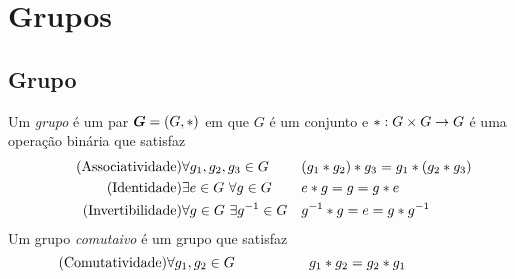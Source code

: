 \chapter{Grupos}

\section{Grupo}


\begin{defi}
	Um \emph{grupo} é um par $\bm G=(G, \ast )$ em que $G$ é um conjunto e $ \ast : G \times G \to G$ é uma operação binária que satisfaz
	\begin{align*}
 	\tag{Associatividade} &\forall g_1,g_2,g_3 \in G && (g_1  \ast  g_2)  \ast  g_3 = g_1  \ast  (g_2  \ast  g_3) \label{G1}\\
	\tag{Identidade} &\exists e \in G\ \forall g \in G && e  \ast  g = g =g  \ast  e \label{G2}\\
	\tag{Invertibilidade} &\forall g \in G\ \exists g^{-1} \in G && g^{-1}  \ast  g = e = g  \ast  g^{-1} \label{G3}
	\end{align*}
\noindent
Um grupo \emph{comutaivo} é um grupo que satisfaz
	\begin{equation*}
	\tag{Comutatividade} \forall g_1,g_2 \in G \qquad\qquad\quad\ g_1  \ast  g_2 = g_2  \ast  g_1 \qquad\qquad\qquad\label{G4}
\end{equation*}
\end{defi}

